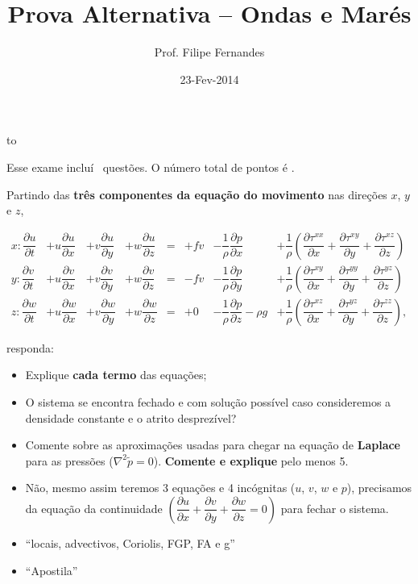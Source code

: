 \documentclass[letterpaper,portuguese,12pt,pdftex]{exam}
\title{Prova Alternativa -- Ondas e Marés}
\author{Prof. Filipe Fernandes}
\date{23-Fev-2014}
\newcommand{\pd}[2]{\dfrac{\partial #1}{\partial #2}}
\begin{document}
\maketitle
\doublespacing

\vspace{1cm}
\hbox to \textwidth{Nome e número de matrícula:\enspace\hrulefill}
\vspace{1cm}

\begin{minipage}{.8\textwidth}
Esse exame incluí \numquestions\ questões. O número total de pontos é \numpoints.
\end{minipage}

\begin{questions}

\question[8]
Partindo das {\bf três componentes da equação do movimento} nas direções
$x$, $y$ e $z$,

\begin{align*}
x: \pd{u}{t} &+ u\pd{u}{x} &+ v\pd{u}{y} &+ w\pd{u}{z} &= &+ fv &- \dfrac{1}{\rho}\pd{p}{x}         &+ \dfrac{1}{\rho}\left(\pd{\tau^{xx}}{x} + \pd{\tau^{xy}}{y} + \pd{\tau^{xz}}{z}\right) \\
y: \pd{v}{t} &+ u\pd{v}{x} &+ v\pd{v}{y} &+ w\pd{v}{z} &= &- fv &- \dfrac{1}{\rho}\pd{p}{y}         &+ \dfrac{1}{\rho}\left(\pd{\tau^{xy}}{x} + \pd{\tau^{yy}}{y} + \pd{\tau^{yz}}{z}\right) \\
z: \pd{w}{t} &+ u\pd{w}{x} &+ v\pd{w}{y} &+ w\pd{w}{z} &= &+  0 &- \dfrac{1}{\rho}\pd{p}{z} -\rho g &+ \dfrac{1}{\rho}\left(\pd{\tau^{xz}}{x} + \pd{\tau^{yz}}{y} + \pd{\tau^{zz}}{z}\right),
\end{align*}

responda:
\begin{itemize}
  \item Explique {\bf cada termo} das equações;
  \item O sistema se encontra fechado e com solução possível caso
        consideremos a densidade constante e o atrito desprezível?
  \item Comente sobre as aproximações usadas para chegar na equação de
        {\bf Laplace} para as pressões ($\nabla^2 \tilde{p}= 0$).
        {\bf Comente e explique} pelo menos 5.
\end{itemize}


\begin{solution}
  \begin{itemize}
    \item Não, mesmo assim teremos 3 equações e 4 incógnitas ($u$, $v$, $w$ e
    $p$), precisamos da equação da continuidade
    $\left( \pd{u}{x} + \pd{v}{y} + \pd{w}{z} = 0 \right)$ para fechar o sistema.
    \item ``locais, advectivos, Coriolis, FGP, FA e g''
    \item ``Apostila''
  \end{itemize}
\end{solution}


\end{questions}
\end{document}

